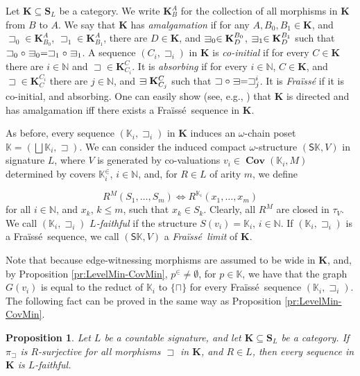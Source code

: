 \documentclass[12pt]{amsart}
\theoremstyle{plain}
\newtheorem{proposition}[theorem]{\bf Proposition}
\newcommand \sqsp{\sqsupset}
\newcommand{\sqni}{\mathrel{\vphantom{\sqsupset}\text{\mathsurround=0pt\ooalign{$\sqsupset$\cr$-$\cr}}}}
\newcommand \Sp{{\mathsf{S}}}
\newcommand \fra{Fra\"{i}ss\'{e}}
\newcommand \KKf{\mathbf{K}}
\newcommand \SSf{\mathbf{S}}
\newcommand \KKb{\mathbb{K}}
\newcommand \NN{\mathbb{N}}
\DeclareMathOperator{\Cov}{\mathbf{Cov}}
\begin{document}
Let  $\KKf \subseteq \SSf_L$ be a category. We write $\KKf^A_B$ for the collection of all morphisms in $\KKf$ from $B$ to $A$. We say that $\KKf$ has \emph{amalgamation} if for any $A,B_0,B_1 \in \KKf$, and $\sqsp_0 \in \KKf^A_{B_0}$, $\sqsp_1 \in \KKf^A_{B_1}$, there are $D \in \KKf$, and $\sqni_0 \in \KKf^{B_0}_D$, $\sqni_1 \in \KKf^{B_1}_D$ such that $\sqsp_0 \circ \sqni_0=\sqsp_1 \circ \sqni_1$. A sequence $(C_i, \sqsp_i)$ in $\KKf$ is \emph{co-initial} if for every $C \in \KKf$ there are $i \in \NN$ and $\sqsp \in \KKf^C_{C_i}$. It is \emph{absorbing} if for every $i \in \NN$, $C \in \KKf$, and $\sqsp \in \KKf^{C_i}_C$ there are $j \in \NN$, and $\sqni \KKf^C_{C_j}$ such that $\sqsp \circ \sqni=\sqsp^i_j$. It is \emph{\fra} if it is co-initial, and absorbing.  One can easily show (see, e.g., \cite[Proposition 4.30]{BaBiVi2}) that $\KKf$ is directed and has amalgamation iff there exists a \fra \  sequence in $\KKf$.

As before, every sequence $(\KKb_i, \sqsp_i)$ in $\KKf$ induces an  $\omega$-chain poset $\KKb=(\bigsqcup \KKb_i, \sqsp)$. We can consider the induced compact $\omega$-structure $(\Sp \KKb, V )$ in signature $L$, where $V$ is generated by co-valuations $v_i \in \Cov(\KKb_i, M)$ determined by covers $\KKb^\in_i$, $i \in \NN$, and, for $R \in L$ of arity $m$, we define

\[R^{M}(S_1, \ldots, S_m) \iff R^{\KKb_i}(x_1, \ldots, x_m)\]
%
for all $i \in \NN$, and $x_k$, $k \leq m$, such that $x_k \in S_k$. Clearly, all $R^M$ are closed in $\tau_V$. We call $(\KKb_i, \sqsp_i)$ \emph{$L$-faithful} if the structure $S(v_i)=\KKb_i$, $i \in \NN$. If $(\KKb_i, \sqsp_i)$ is a \fra \ sequence, we call $( \Sp \KKb,V)$ a  \emph{\fra \  limit} of $\KKf$. 

Note that because edge-witnessing morphisms are assumed to be wide in $\KKf$, and, by Proposition \ref{pr:LevelMin-CovMin}, $p^\in \neq \emptyset$, for $p \in \KKb$, we have that the graph $G(v_i)$ is equal to the reduct of $\KKb_i$ to $\{\sqcap\}$ for every \fra \ sequence  $(\KKb_i, \sqsp_i)$. The following fact can be proved in the same way as Proposition \ref{pr:LevelMin-CovMin}.

\begin{proposition}
\label{pr:PiRSurjective}
Let $L$ be a countable signature, and let $\KKf \subseteq \SSf_L$ be a category. If $\pi_{\sqsp}$ is $R$-surjective for all morphisms $\sqsp$ in $\KKf$,  and $R \in L$,  then every sequence in $\KKf$ is $L$-faithful.
\end{proposition}
\end{document}
